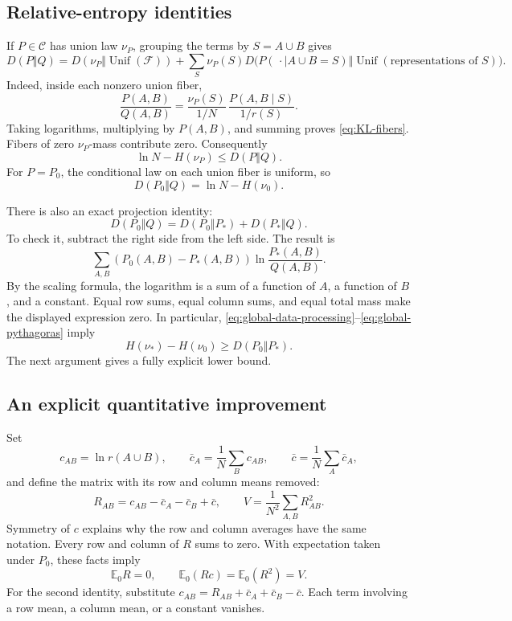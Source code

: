 \documentclass[11pt]{article}
\theoremstyle{remark}
\newcommand{\F}{\mathcal F}
\begin{document}
\subsection{Relative-entropy identities}
If \(P\in\mathcal C\) has union law \(\nu_P\), grouping the terms by
\(S=A\cup B\) gives
\begin{equation}\label{eq:KL-fibers}
D(P\Vert Q)
=D(\nu_P\Vert\operatorname{Unif}(\F))
 + \sum_S \nu_P(S)
 D\bigl(P(\,\cdot\mid A\cup B=S)\Vert
             \operatorname{Unif}(\text{representations of }S)\bigr).
\end{equation}
Indeed, inside each nonzero union fiber,
\[
\frac{P(A,B)}{Q(A,B)}
=\frac{\nu_P(S)}{1/N}\,
  \frac{P(A,B\mid S)}{1/r(S)}.
\]
Taking logarithms, multiplying by \(P(A,B)\), and summing proves
\eqref{eq:KL-fibers}. Fibers of zero \(\nu_P\)-mass contribute zero.
Consequently
\begin{equation}\label{eq:global-data-processing}
\ln N-H(\nu_P)\le D(P\Vert Q).
\end{equation}
For \(P=P_0\), the conditional law on each union fiber is uniform, so
\begin{equation}\label{eq:D0}
D(P_0\Vert Q)=\ln N-H(\nu_0).
\end{equation}

There is also an exact projection identity:
\begin{equation}\label{eq:global-pythagoras}
D(P_0\Vert Q)=D(P_0\Vert P_*)+D(P_*\Vert Q).
\end{equation}
To check it, subtract the right side from the left side. The result is
\[
\sum_{A,B}(P_0(A,B)-P_*(A,B))
             \ln\frac{P_*(A,B)}{Q(A,B)}.
\]
By the scaling formula, the logarithm is a sum of a function of \(A\),
a function of \(B\), and a constant. Equal row sums, equal column sums,
and equal total mass make the displayed expression zero.
In particular, \eqref{eq:global-data-processing}--\eqref{eq:global-pythagoras}
imply
\[
H(\nu_*)-H(\nu_0)\ge D(P_0\Vert P_*).
\]
The next argument gives a fully explicit lower bound.

\subsection{An explicit quantitative improvement}
Set
\[
c_{AB}=\ln r(A\cup B),\qquad
\bar c_A=\frac1N\sum_B c_{AB},\qquad
\bar c=\frac1N\sum_A\bar c_A,
\]
and define the matrix with its row and column means removed:
\[
R_{AB}=c_{AB}-\bar c_A-\bar c_B+\bar c,\qquad
V=\frac1{N^2}\sum_{A,B}R_{AB}^2.
\]
Symmetry of \(c\) explains why the row and column averages have the
same notation. Every row and column of \(R\) sums to zero.
With expectation taken under \(P_0\), these facts imply
\begin{equation}\label{eq:orthogonal}
\mathbb E_0R=0,\qquad \mathbb E_0(Rc)=\mathbb E_0(R^2)=V.
\end{equation}
For the second identity, substitute
\(c_{AB}=R_{AB}+\bar c_A+\bar c_B-\bar c\).
Each term involving a row mean, a column mean, or a constant vanishes.
\end{document}
